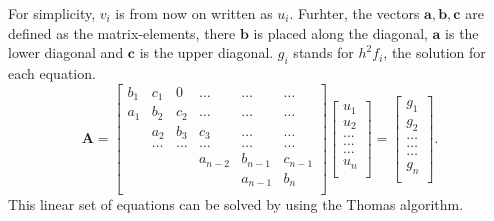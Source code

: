 \documentclass[%
oneside,                 %
final,                   %
10pt]{article}
\begin{document}
For simplicity, $v_i$ is from now on written as $u_i$.
Furhter, the vectors $ \mathbf{a}, \mathbf{b}, \mathbf{c}$ are defined as the matrix-elements, there $ \mathbf{b}$ is placed along the diagonal, $\mathbf{a}$ is the lower diagonal and $\mathbf{c}$ is the upper diagonal. $g_i$ stands for $h^2f_i$, the solution for each equation. \\
\[
    \mathbf{A} = \begin{bmatrix}
                           b_1& c_1 & 0 &\dots   & \dots &\dots \\
                           a_1 & b_2 & c_2 &\dots &\dots &\dots \\
                           & a_2 & b_3 & c_3 & \dots & \dots \\
                           & \dots   & \dots &\dots   &\dots & \dots \\
                           &   &  &a_{n-2}  &b_{n-1}& c_{n-1} \\
                           &    &  &   &a_{n-1} & b_n \\
                      \end{bmatrix}\begin{bmatrix}
                           u_1\\
                           u_2\\
                           \dots \\
                          \dots  \\
                          \dots \\
                           u_n\\
                      \end{bmatrix}
  =\begin{bmatrix}
                           g_1\\
                           g_2\\
                           \dots \\
                           \dots \\
                          \dots \\
                           g_n\\
                      \end{bmatrix}.
\]
This linear set of equations can be solved by using the Thomas algorithm.
\end{document}
